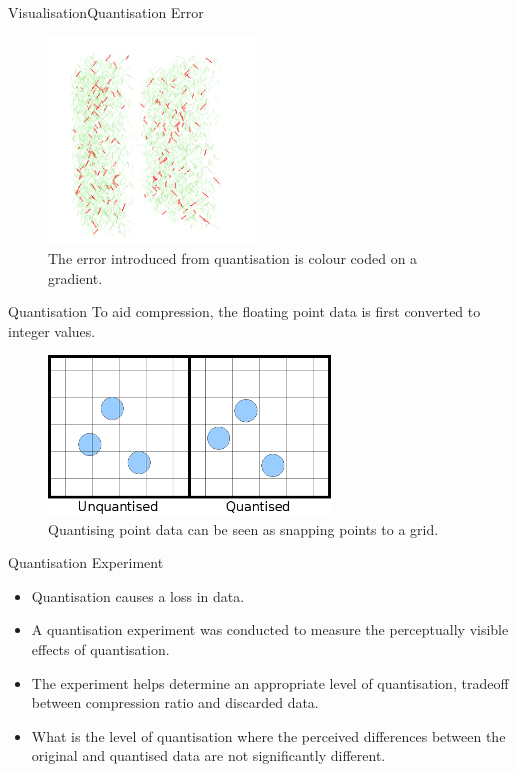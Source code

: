 \documentclass{beamer}
\begin{document}
\begin{frame}{Visualisation}{Quantisation Error}
\begin{figure}
  \centering
  \includegraphics[width=55mm]{min-images/quantisation-error-line.png}
  \caption{The error introduced from quantisation is colour coded on a gradient.}
\end{figure}
\end{frame}

\begin{frame}{Quantisation}
To aid compression, the floating point data is first converted to integer values.

\begin{figure}
  \centering
  \includegraphics[width=75mm]{min-images/quantisation.png}
  \caption{Quantising point data can be seen as snapping points to a grid.}
\end{figure}
\end{frame}

\begin{frame}{Quantisation Experiment}

\begin{itemize}

  \item Quantisation causes a loss in data.

  \item A quantisation experiment was conducted to measure the perceptually visible effects of quantisation.

  \item The experiment helps determine an appropriate level of quantisation, tradeoff between compression ratio and discarded data.

  \item What is the level of quantisation where the perceived differences between the original and quantised data are not significantly different.

\end{itemize}

\end{frame}
\end{document}
